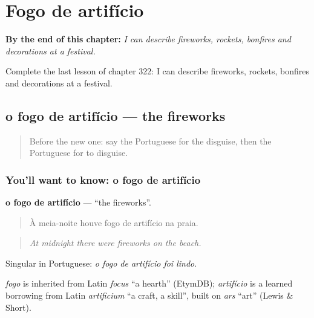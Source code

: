
\chapter{Fogo de artifício}
\label{ch:pt-fogo-de-artificio}

\begin{chapteropening}
\textbf{By the end of this chapter:} \emph{I can describe fireworks, rockets, bonfires and decorations at a festival.}

Complete the last lesson of chapter 322: I can describe fireworks, rockets, bonfires and decorations at a festival.
\end{chapteropening}

\section[o fogo de artifício]{o fogo de artifício — the fireworks}

\label{lesson:PT-C322-fogo-de-artificio}



\begin{quote}
Before the new one: say the Portuguese for the disguise, then the Portuguese for to disguise.
\end{quote}

\subsection*{You'll want to know: o fogo de artifício}
\textbf{o fogo de artifício} — \textquotedblleft{}the fireworks\textquotedblright{}.

\begin{quote}
À meia-noite houve fogo de artifício na praia.
\end{quote}

\begin{quote}
\emph{At midnight there were fireworks on the beach.}
\end{quote}

Singular in Portuguese: \emph{o fogo de artifício foi lindo}.

\begin{cousinweb}
\emph{fogo} is inherited from Latin \emph{focus} \textquotedblleft{}a hearth\textquotedblright{} (EtymDB); \emph{artifício} is a learned borrowing from Latin \emph{artificium} \textquotedblleft{}a craft, a skill\textquotedblright{}, built on \emph{ars} \textquotedblleft{}art\textquotedblright{} (Lewis \& Short).
\end{cousinweb}


